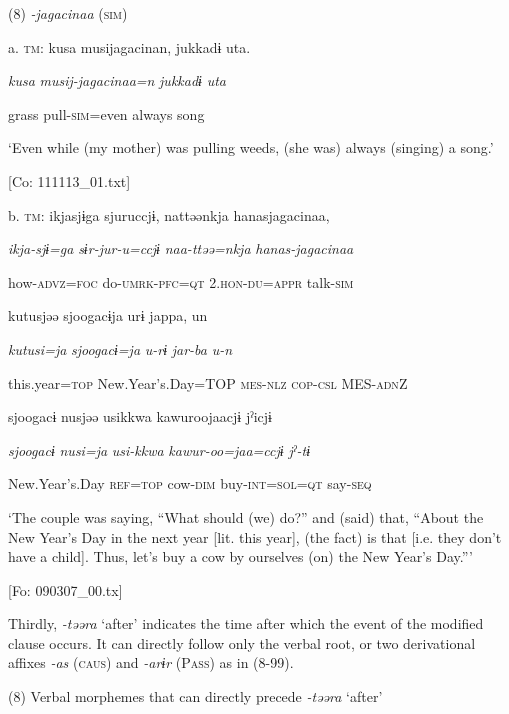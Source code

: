 (8)  \textit{{}-jagacinaa} (\textsc{sim})

  a.  \textsc{tm}:  kusa  musijagacinan,  jukkadɨ  uta.

      \textit{kusa}  \textit{musij-jagacinaa=n}  \textit{jukkadɨ}  \textit{uta}

      grass  pull-\textsc{sim}=even  always  song

      ‘Even while (my mother) was pulling weeds, (she was) always (singing) a song.’

      [Co: 111113\_01.txt]

  b.  \textsc{tm}:  ikjasjɨga  sjuruccjɨ,  nattəənkja  hanasjagacinaa,

      \textit{ikja-sjɨ=ga}  \textit{sɨr-jur-u=ccjɨ}  \textit{naa-ttəə=nkja}  \textit{hanas-jagacinaa}

      how-\textsc{advz}=\textsc{foc}  do-\textsc{umrk}-\textsc{pfc}=\textsc{qt}  2.\textsc{hon}-\textsc{du}=\textsc{appr}  talk-\textsc{sim}

      kutusjəə  sjoogacɨja  urɨ  jappa,  un

      \textit{kutusi=ja}  \textit{sjoogacɨ=ja}  \textit{u-rɨ}  \textit{jar-ba}  \textit{u-n}

      this.year=\textsc{top}  New.Year’s.Day=TOP  \textsc{mes}-\textsc{nlz}  \textsc{cop}-\textsc{csl}  MES-\textsc{adn}Z

      sjoogacɨ  nusjəə  usikkwa  kawuroojaacjɨ  jˀicjɨ

      \textit{sjoogacɨ}  \textit{nusi=ja}  \textit{usi-kkwa}  \textit{kawur-oo=jaa=ccjɨ}  \textit{jˀ-tɨ}

      New.Year’s.Day  \textsc{ref}=\textsc{top}  cow-\textsc{dim}  buy-\textsc{int}=\textsc{sol}=\textsc{qt}  say-\textsc{seq}

      ‘The couple was saying, “What should (we) do?” and (said) that, “About the New Year’s Day in the next year [lit. this year], (the fact) is that [i.e. they don’t have a child]. Thus, let’s buy a cow by ourselves (on) the New Year’s Day.”’

      [Fo: 090307\_00.tx]

  Thirdly, \textit{{}-təəra} ‘after’ indicates the time after which the event of the modified clause occurs. It can directly follow only the verbal root, or two derivational affixes \textit{{}-as} (\textsc{caus}) and \textit{{}-arɨr} (P\textsc{ass}) as in (8-99).

(8)  Verbal morphemes that can directly precede \textit{{}-təəra} ‘after’

